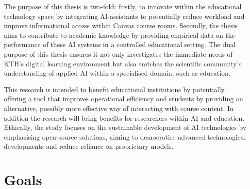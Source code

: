 

The purpose of this thesis is two-fold: firstly, to innovate within the educational technology space by integrating AI-assistants to potentially reduce workload and improve informational access within Canvas course rooms. Secondly, the thesis aims to contribute to academic knowledge by providing empirical data on the performance of these AI systems in a controlled educational setting. The dual purpose of this thesis ensures it not only investigates the immediate needs of KTH's digital learning environment but also enriches the scientific community’s understanding of applied AI within a specialised domain, such as education.


This research is intended to benefit educational institutions by potentially offering a tool that improves operational efficiency and students by providing an alternative, possibly more effective way of interacting with course content. In addition the research will bring benefits for researchers within AI and education. Ethically, the study focuses on the sustainable development of AI technologies by emphasising open-source solutions, aiming to democratise advanced technological developments and reduce reliance on proprietary models.




\section{Goals}
\label{sec:goals}




